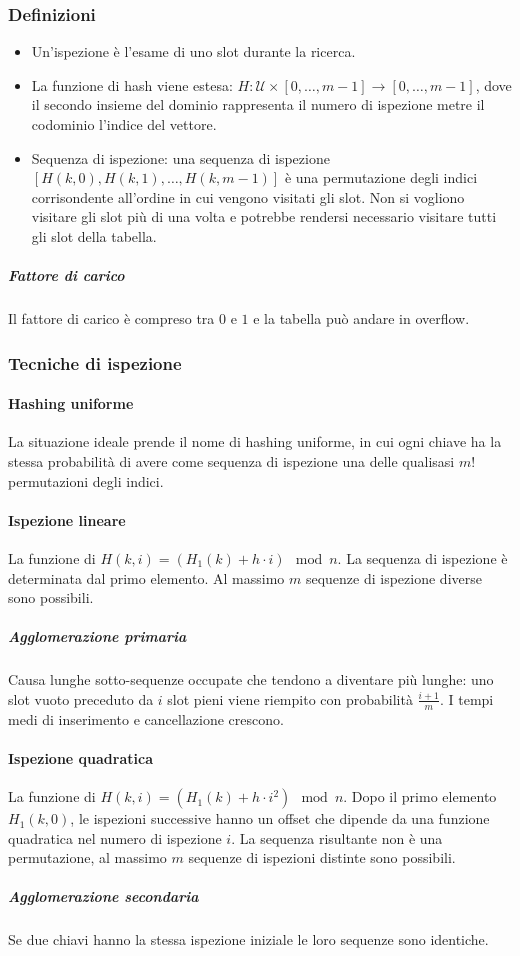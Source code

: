 \subsubsection{Definizioni}
\begin{itemize}
    \item Un'ispezione \`e l'esame di uno slot durante la ricerca.
    \item La funzione di hash viene estesa: $H:\mathcal{U}\times[0,\dots, m-1]\rightarrow[0,\dots, m-1]$, dove il secondo insieme del dominio rappresenta il
          numero di ispezione metre il codominio l'indice del vettore.
    \item Sequenza di ispezione: una sequenza di ispezione $[H(k, 0), H(k, 1),\dots, H(k, m-1)]$ \`e una permutazione degli indici corrisondente all'ordine in
          cui vengono visitati gli slot. Non si vogliono visitare gli slot pi\`u di una volta e potrebbe rendersi necessario visitare tutti gli slot della tabella.
\end{itemize}
\subparagraph{Fattore di carico}
Il fattore di carico \`e compreso tra $0$ e $1$ e la tabella pu\`o andare in overflow.
\subsubsection{Tecniche di ispezione}
\paragraph{Hashing uniforme}
La situazione ideale prende il nome di hashing uniforme, in cui ogni chiave ha la stessa probabilit\`a di avere come sequenza di ispezione una delle
qualisasi $m!$ permutazioni degli indici.
\paragraph{Ispezione lineare}
La funzione di $H(k, i)= (H_1(k)+h\cdot i)\mod n$. La sequenza di ispezione \`e determinata dal primo elemento. Al massimo $m$ sequenze di ispezione diverse
sono possibili.
\subparagraph{Agglomerazione primaria}
Causa lunghe sotto-sequenze occupate che tendono a diventare pi\`u lunghe: uno slot vuoto preceduto da $i$ slot pieni viene riempito con probabilit\`a
$\frac{i+1}{m}$. I tempi medi di inserimento e cancellazione crescono.
\paragraph{Ispezione quadratica}
La funzione di $H(k, i)= (H_1(k)+h\cdot i^2)\mod n$. Dopo il primo elemento $H_1(k, 0)$, le ispezioni successive hanno un offset che dipende da una funzione
quadratica nel numero di ispezione $i$. La sequenza risultante non \`e una permutazione, al massimo $m$ sequenze di ispezioni distinte sono possibili.
\subparagraph{Agglomerazione secondaria}
Se due chiavi hanno la stessa ispezione iniziale le loro sequenze sono identiche.
